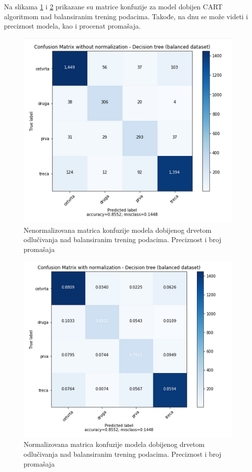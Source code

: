 \documentclass[a4paper]{article}
\begin{document}
Na slikama \ref{fig:mat_balansirana1} i \ref{fig:mat_balansirana2} prikazane su matrice konfuzije za model dobijen CART algoritmom nad balansiranim trening podacima. Takođe, na dnu se može videti i preciznost modela, kao i procenat promašaja.

\begin{figure}[h!]
\begin{center}
\includegraphics[scale=0.5]{drvo-balansirano-nenormalizovana-mat-konf.png}
\end{center}
\caption{Nenormalizovana matrica konfuzije modela dobijenog drvetom odlučivanja nad balansiranim trening podacima. Preciznost i broj promašaja}
\label{fig:mat_balansirana1}
\end{figure}


\begin{figure}[h!]
\begin{center}
\includegraphics[scale=0.5]{drvo-balansirano-normalizovana-mat-konf.png}
\end{center}
\caption{Normalizovana matrica konfuzije modela dobijenog drvetom odlučivanja nad balansiranim trening podacima. Preciznost i broj promašaja}
\label{fig:mat_balansirana2}
\end{figure}
\end{document}
